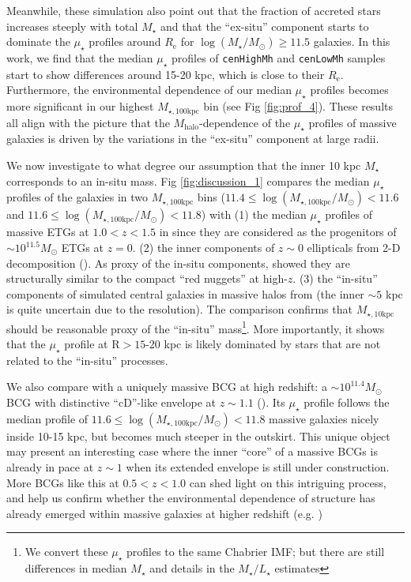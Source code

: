 \documentclass[a4paper,fleqn,usenatbib]{mnras}
\def\rbcg{\texttt{cenHighMh}}
\def\nbcg{\texttt{cenLowMh}}
\def\mstar{{$M_{\star}$}}
\def\mhalo{{$M_{\mathrm{halo}}$}}
\def\logms{{$\log (M_{\star}/M_{\odot})$}}
\def\minn{{$M_{\star,10\mathrm{kpc}}$}}
\def\mtot{{$M_{\star,100\mathrm{kpc}}$}}
\def\logmtot{{$\log (M_{\star,100\mathrm{kpc}}/M_{\odot})$}}
\def\m2l{{$M_{\star}/L_{\star}$}}
\def\mden{{$\mu_{\star}$}}
\begin{document}
    Meanwhile, these simulation also point out that the fraction of accreted stars 
    increases steeply with total \mstar{} and that the ``ex-situ'' component
    starts to dominate the \mden{} profiles around $R_{\mathrm{e}}$ for 
    \logms{}$\geq 11.5$ galaxies. 
    In this work, we find that the median \mden{} profiles of \rbcg{} and \nbcg{} 
    samples start to show differences around 15-20 kpc, which is close to 
    their $R_{\mathrm{e}}$. 
    Furthermore, the environmental dependence of our median \mden{} profiles 
    becomes more significant in our highest \mtot{} bin (see Fig \ref{fig:prof_4}). 
    These results all align with the picture that the \mhalo{}-dependence of the 
    \mden{} profiles of massive galaxies is driven by the variations in the 
    ``ex-situ'' component at large radii. 
   
    We now investigate to what degree our assumption that the inner 10 kpc \mstar{}
    corresponds to an in-situ mass.    
    Fig \ref{fig:discussion_1} compares the median \mden{} profiles of the 
    galaxies in two \mtot{} bins 
    ($11.4\leq$\logmtot{}$<11.6$ and $11.6\leq$\logmtot{}$<11.8$) with 
    (1) the median \mden{} profiles of massive ETGs at $1.0 < z < 1.5$ in
    \citealt{Patel2013} since they are considered as the progenitors of 
    ${\sim} 10^{11.5} M_{\odot}$ ETGs at $z=0$.    
    (2) the inner components of $z{\sim} 0$ ellipticals from 2-D decomposition 
    (\citealt{Huang2013a}).
    As proxy of the in-situ components, \citet{Huang2013b} showed they are 
    structurally similar to the compact ``red nuggets'' at high-$z$. 
    (3) the ``in-situ'' components of simulated central galaxies in massive halos 
    from \citet{Cooper2013} (the inner ${\sim} 5$ kpc is quite uncertain due to the 
    resolution).  
    The comparison confirms that \minn{} should be reasonable proxy of the 
    ``in-situ'' mass\footnote{We convert these \mden{} profiles to the same 
    Chabrier IMF; but there are still differences in median \mstar{} and 
    details in the \m2l{} estimates}.  
    More importantly, it shows that the \mden{} profile at 
    $\mathrm{R} > 15$-20 kpc is likely dominated by stars that are not related 
    to the ``in-situ'' processes.  
    
    We also compare with a uniquely massive BCG at high redshift: 
    a ${\sim} 10^{11.4} M_{\odot}$ BCG with distinctive ``cD''-like envelope at 
    $z{\sim} 1.1$ (\citealt{Liu2013}).  
    Its \mden{} profile follows the median profile of $11.6\leq$\logmtot{}$<11.8$ 
    massive galaxies nicely inside 10-15 kpc, but becomes much steeper in the outskirt.  
    This unique object may present an interesting case where the inner ``core'' of a 
    massive BCGs is already in pace at $z{\sim} 1$ when its extended envelope is still
    under construction.
    More BCGs like this at $0.5 < z < 1.0$ can shed light on this intriguing 
    process, and help us confirm whether the environmental dependence of structure 
    has already emerged within massive galaxies at higher redshift 
    (e.g. \citealt{Papovich2012})
    
\end{document}
